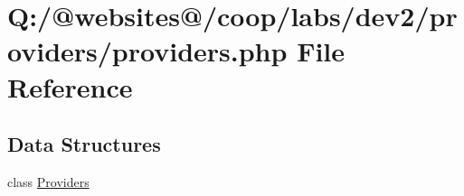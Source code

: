 \hypertarget{providers_8php}{\section{Q\-:/@websites@/coop/labs/dev2/providers/providers.php File Reference}
\label{providers_8php}
}
\subsection*{Data Structures}
\begin{DoxyCompactItemize}
\item 
class \hyperlink{class_providers}{Providers}
\end{DoxyCompactItemize}

